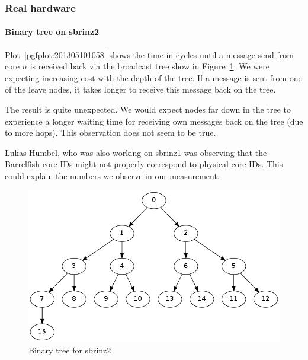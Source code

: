 \documentclass{article}
\begin{document}
\subsubsection{Real hardware}

\paragraph{Binary tree on sbrinz2}

Plot~\ref{pgfplot:201305101058} shows the time in cycles until a
message send from core $n$ is received back via the broadcast tree
show in Figure~\ref{fig:binary_tree_sbrinz2}. We were expecting
increasing cost with the depth of the tree. If a message is sent from
one of the leave nodes, it takes longer to receive this message back
on the tree.

The result is quite unexpected. We would expect nodes far down in the
tree to experience a longer waiting time for receiving own messages
back on the tree (due to more hops). This observation does not seem to
be true. 

Lukas Humbel, who was also working on sbrinz1 was observing that the
Barrelfish core IDs might not properly correspond to physical core
IDs. This could explain the numbers we observe in our measurement.

\begin{figure}[htb]
  \centering
  \includegraphics[width=\linewidth]{binary_tree_sbrinz2}
  \caption{Binary tree for sbrinz2}
  \label{fig:binary_tree_sbrinz2}
\end{figure}
\end{document}
